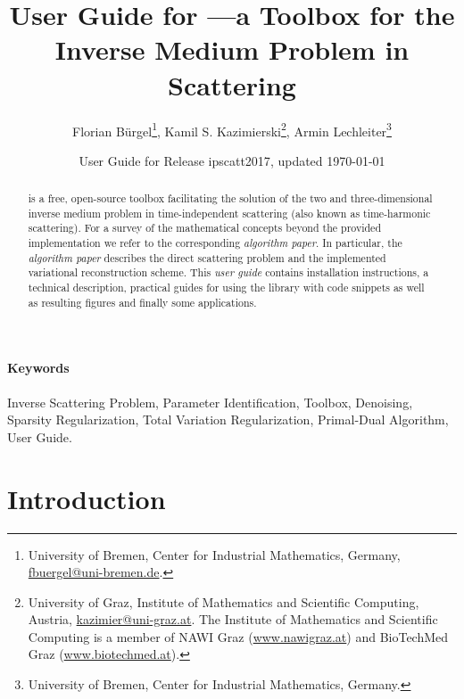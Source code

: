 \documentclass[a4paper]{article}
\begin{document}
\title{\Large User Guide for \IPscatt---a \MATLAB Toolbox for the Inverse Medium Problem in Scattering}

\author{
Florian B\"urgel\footnote{University of Bremen, Center for Industrial Mathematics, Germany,
\textsf{\href{mailto:fbuergel@uni-bremen.de}{fbuergel@uni-bremen.de}}.}, \quad
Kamil S. Kazimierski\footnote{University of Graz, Institute of Mathematics and Scientific Computing, Austria, \textsf{\href{mailto:kazimier@uni-graz.at}{kazimier@uni-graz.at}}. The Institute of Mathematics and Scientific Computing is a member of NAWI Graz (\url{www.nawigraz.at}) and BioTechMed Graz (\url{www.biotechmed.at}).}, \quad
Armin Lechleiter\footnote{University of Bremen, Center for Industrial Mathematics, Germany.}
}

\date{User Guide for Release \textsf{ipscatt2017}, updated \today}

\maketitle

\begin{abstract}
\IPscatt is a free, open-source \MATLAB toolbox facilitating the solution of the two and three-dimensional inverse medium problem in time-independent scattering (also known as time-harmonic scattering).
%
For a survey of the mathematical concepts beyond the provided implementation we refer to the corresponding \emph{algorithm paper}. In particular, the \emph{algorithm paper} describes the direct scattering problem and the implemented variational reconstruction scheme.
%
This \emph{user guide} contains installation instructions, a technical description, practical guides for using the library with code snippets as well as resulting figures and finally some applications.
\end{abstract}

{\small \paragraph{Keywords} Inverse Scattering Problem, Parameter Identification, \MATLAB Toolbox, Denoising, Sparsity Regularization, Total Variation Regularization, Primal-Dual Algorithm, User Guide.}

\tableofcontents


\section*{Introduction}
\end{document}
